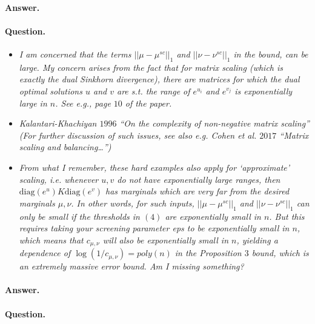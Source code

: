 \documentclass[11pt]{article}
\begin{document}
\paragraph{Answer.} 

\paragraph{Question.}

\begin{itemize}

	\item  \emph{I am concerned that the terms $||\mu-\mu^{sc}||_1$ and $||\nu-\nu^{sc}||_1$ in the bound, can be large. My concern arises from the fact that for matrix scaling (which is exactly the dual Sinkhorn divergence), there are matrices for which the dual optimal solutions $u$ and $v$ are s.t. the range of $e^{u_i}$ and $e^{v_j}$ is exponentially large in $n$. See e.g., page $10$ of the paper.}

\item  \emph{Kalantari-Khachiyan $1996$ “On the complexity of non-negative matrix scaling”
(For further discussion of such issues, see also e.g. Cohen et al. $2017$ “Matrix scaling and balancing…”)}

\item  \emph{From what I remember, these hard examples also apply for `approximate’ scaling, i.e. whenever $u,v$ do not have exponentially large ranges, then $\text{diag}(e^u) K \text{diag}(e^v)$ has marginals which are very far from the desired marginals $\mu,\nu$. In other words, for such inputs, $||\mu-\mu^{sc}||_1$ and $||\nu-\nu^{sc}||_1$ can only be small if the thresholds in $(4)$ are exponentially small in $n$. But this requires taking your screening parameter eps to be exponentially small in $n$, which means that $c_{\mu,\nu}$ will also be exponentially small in $n$, yielding a dependence of $\log(1/c_{\mu,\nu}) = poly(n)$ in the Proposition $3$ bound, which is an extremely massive error bound. Am I missing something?}

\end{itemize}

\paragraph{Answer.} 

\paragraph{Question.}
\end{document}
